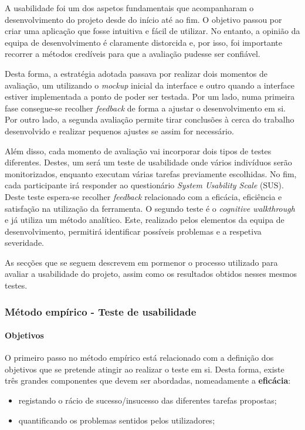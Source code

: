A usabilidade foi um dos aspetos fundamentais que acompanharam o
desenvolvimento do projeto desde do início até ao fim. O objetivo passou por
criar uma aplicação que fosse intuitiva e fácil de utilizar. No entanto, a
opinião da equipa de desenvolvimento é claramente distorcida e, por isso, foi
importante recorrer a métodos credíveis para que a avaliação pudesse ser
confiável.

Desta forma, a estratégia adotada passava por realizar dois momentos de
avaliação, um utilizando o \textit{mockup} inicial da interface e outro quando a
interface estiver implementada a ponto de poder ser testada. Por um lado, numa
primeira fase consegue-se recolher \textit{feedback} de forma a ajustar o
desenvolvimento em si. Por outro lado, a segunda avaliação permite tirar
conclusões à cerca do trabalho desenvolvido e realizar pequenos ajustes se
assim for necessário.

Além disso, cada momento de avaliação vai incorporar dois tipos de testes
diferentes. Destes, um será um teste de usabilidade onde vários indivíduos
serão monitorizados, enquanto executam várias tarefas previamente escolhidas. No
fim, cada participante irá responder ao questionário \textit{System Usability Scale} (SUS). Deste teste
espera-se recolher \textit{feedback} relacionado com a eficácia, eficiência e
satisfação na utilização da ferramenta. O segundo teste é o \textit{cognitive
walkthrough} e já utiliza um método analítico. Este, realizado pelos elementos
da equipa de desenvolvimento, permitirá identificar possíveis problemas e a
respetiva severidade.

As secções que se seguem descrevem em pormenor o processo utilizado para
avaliar a usabilidade do projeto, assim como os resultados obtidos nesses
mesmos testes.

\subsubsection{Método empírico - Teste de usabilidade}
\label{sec:orgcf0b6f9}
\paragraph{Objetivos}
\label{sec:org95e7a36}
O primeiro passo no método empírico está relacionado com a definição dos
objetivos que se pretende atingir ao realizar o teste em si. Desta forma,
existe três grandes componentes que devem ser abordadas, nomeadamente a
\textbf{eficácia}:

\begin{itemize}
\item registando o rácio de sucesso/insucesso das diferentes tarefas propostas;
\item quantificando os problemas sentidos pelos utilizadores;
\end{itemize}

